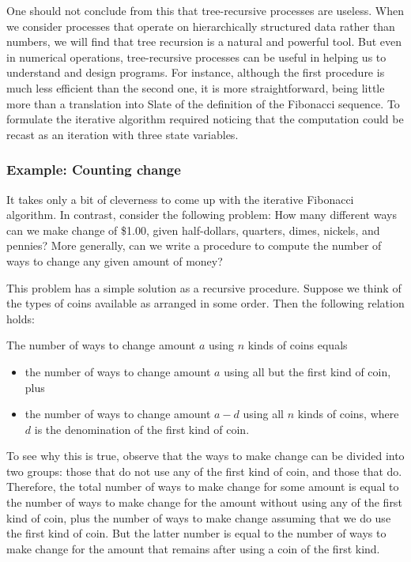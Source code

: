 One should not conclude from this that tree-recursive processes are useless. When we consider processes that operate on hierarchically structured data rather than numbers, we will find that tree recursion is a natural and powerful tool. But even in numerical operations, tree-recursive processes can be useful in helping us to understand and design programs. For instance, although the first  procedure is much less efficient than the second one, it is more straightforward, being little more than a translation into Slate of the definition of the Fibonacci sequence. To formulate the iterative algorithm required noticing that the computation could be recast as an iteration with three state variables.

\subsubsection{Example: Counting change}

It takes only a bit of cleverness to come up with the iterative Fibonacci algorithm. In contrast, consider the following problem: How many different ways can we make change of \$1.00, given half-dollars, quarters, dimes, nickels, and pennies? More generally, can we write a procedure to compute the number of ways to change any given amount of money?

This problem has a simple solution as a recursive procedure. Suppose we think of the types of coins available as arranged in some order. Then the following relation holds:

The number of ways to change amount $a$ using $n$ kinds of coins equals

\begin{itemize}
\item the number of ways to change amount $a$ using all but the first kind of coin, plus
\item the number of ways to change amount $a - d$ using all $n$ kinds of coins, where $d$ is the denomination of the first kind of coin.
\end{itemize}

To see why this is true, observe that the ways to make change can be divided into two groups: those that do not use any of the first kind of coin, and those that do. Therefore, the total number of ways to make change for some amount is equal to the number of ways to make change for the amount without using any of the first kind of coin, plus the number of ways to make change assuming that we do use the first kind of coin. But the latter number is equal to the number of ways to make change for the amount that remains after using a coin of the first kind.

